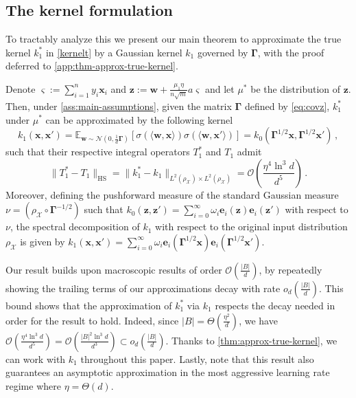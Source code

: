 \subsection{The kernel formulation}

To tractably analyze this we present our main theorem to approximate the true kernel $k_1^*$ in \cref{kernelt} by a Gaussian kernel $k_1$ governed by $\bm \Gamma$, with the proof deferred to \cref{app:thm-approx-true-kernel}.
\begin{theorem}\label{thm:approx-true-kernel}
    Denote $\bm \varsigma := \sum_{i=1}^n y_i \bm x_i$ and $\bm z := \bm w + \frac{\mu_1\eta}{n \sqrt{m}}a\bm \varsigma$ and let $\mu^*$ be the distribution of $\bm z$. Then, under \cref{ass:main-assumptions}, given the matrix $\bm \Gamma$ defined by \cref{eq:covz}, $k_1^*$ under $\mu^*$ can be approximated by the following kernel 
    \begin{equation}\label{eq:kernel1}
    k_1(\bm x, \bm x') = \mathbb E_{\bm w \sim \mathcal N(0, \frac{1}{d}\bm \Gamma)}[\sigma(\langle \bm w, \bm x\rangle)\sigma(\langle \bm w, \bm x'\rangle)] = k_0(\bm \Gamma^{1/2} \bm x, \bm \Gamma^{1/2}\bm x')\,,
    \end{equation}
    such that their respective integral operators $T_1^*$ and $T_1$ admit
    \[
        \|T_1^* - T_1\|_{\text{HS}} = \|k_1^* - k_1\|_{L^2(\rho_{\mathcal X})\times L^2(\rho_{\mathcal X})} = \mathcal O\left(\frac{\eta^4 \ln^3 d}{d^5}\right)\, .
    \]
    Moreover, defining the pushforward measure of the standard Gaussian measure $\nu = (\rho_{\mathcal X} \circ \bm \Gamma^{-1/2})$ such that $k_0(\bm z, \bm z') = \sum_{i=0}^\infty \omega_i \bm e_i(\bm z)\bm e_i(\bm z')$ with respect to $\nu$, the spectral decomposition of $k_1$ with respect to the original input distribution $\rho_{\mathcal X}$ is given by $k_1(\bm x, \bm x') = \sum_{i=0}^\infty \omega_i \bm e_i(\bm \Gamma^{1/2}\bm x)\bm e_i(\bm \Gamma^{1/2}\bm x')$.
\end{theorem}
\begin{remark}\label{rmk:approx-true-kernel}
    Our result builds upon macroscopic results of order $\mathcal O\left(\frac{|B|}{d}\right)$, by repeatedly showing the trailing terms of our approximations decay with rate $o_d\left(\frac{|B|}{d}\right)$. This bound shows that the approximation of $k_1^*$ via $k_1$ respects the decay needed in order for the result to hold. Indeed, since $|B| = \Theta\left(\frac{\eta^2}{d}\right)$, we have $\mathcal O\left(\frac{\eta^4 \ln^3 d}{d^5}\right) = \mathcal O\left(\frac{|B|^2\ln^3 d}{d^3}\right) \subset o_d\left(\frac{|B|}{d}\right)$. Thanks to \cref{thm:approx-true-kernel}, we can work with $k_1$ throughout this paper. Lastly, note that this result also guarantees an asymptotic approximation in the most aggressive learning rate regime where $\eta = \Theta(d)$.
\end{remark}
